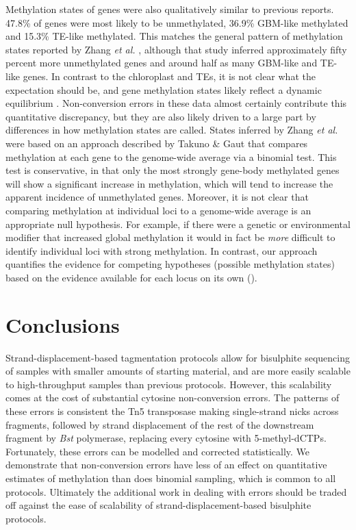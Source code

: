 \documentclass[10pt,letterpaper]{article}
\begin{document}
Methylation states of genes were also qualitatively similar to previous reports.
47.8\% of genes were most likely to be unmethylated, 36.9\% GBM-like methylated and 15.3\% TE-like methylated.
This matches the general pattern of methylation states reported by Zhang \textit{et al.} \cite{zhang2020natural}, although that study inferred approximately fifty percent more unmethylated genes and around half as many GBM-like and TE-like genes.
In contrast to the chloroplast and TEs, it is not clear what the expectation should be, and gene methylation states likely reflect a dynamic equilibrium \cite{zhang2020natural}.
Non-conversion errors in these data almost certainly contribute this quantitative discrepancy, but they are also likely driven to a large part by differences in how methylation states are called.
States inferred by Zhang \textit{et al.} \cite{zhang2020natural} were based on an approach described by Takuno \& Gaut \cite{takuno2012body} that compares methylation at each gene to the genome-wide average via a binomial test.
This test is conservative, in that only the most strongly gene-body methylated genes will show a significant increase in methylation, which will tend to increase the apparent incidence of unmethylated genes.
Moreover, it is not clear that comparing methylation at individual loci to a genome-wide average is an appropriate null hypothesis.
For example, if there were a genetic or environmental modifier that increased global methylation it would in fact be \textit{more} difficult to identify individual loci with strong methylation.
In contrast, our approach quantifies the evidence for competing hypotheses (possible methylation states) based on the evidence available for each locus on its own (\cite{chamberlin1890method, burnham2004multimodel}).

\section*{Conclusions}

Strand-displacement-based tagmentation protocols allow for bisulphite sequencing of samples with smaller amounts of starting material, and are more easily scalable to high-throughput samples than previous protocols.
However, this scalability comes at the cost of substantial cytosine non-conversion errors.
The patterns of these errors is consistent the Tn5 transposase making single-strand nicks across fragments, followed by strand displacement of the rest of the downstream fragment by \textit{Bst} polymerase, replacing every cytosine with 5-methyl-dCTPs.
Fortunately, these errors can be modelled and corrected statistically.
We demonstrate that non-conversion errors have less of an effect on quantitative estimates of methylation than does binomial sampling, which is common to all protocols.
Ultimately the additional work in dealing with errors should be traded off against the ease of scalability of strand-displacement-based bisulphite protocols.
\end{document}
